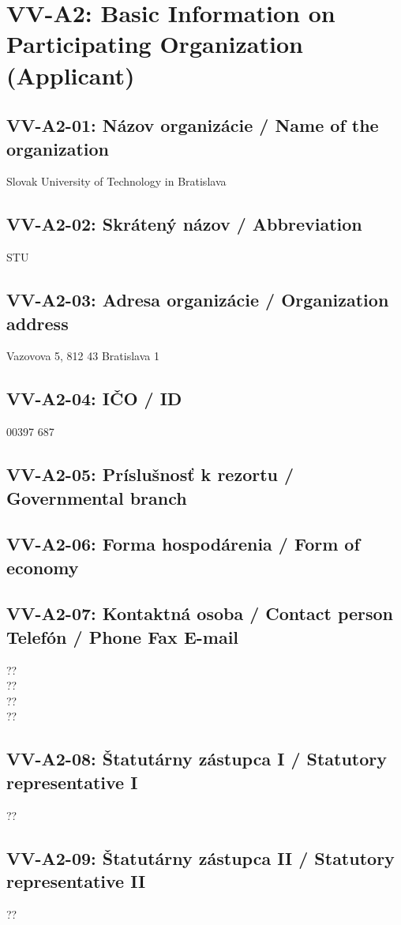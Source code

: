 \section*{VV-A2: Basic Information on Participating Organization (Applicant)}
\subsection*{VV-A2-01: Názov organizácie / Name of the organization}
Slovak University of Technology in Bratislava
\subsection*{VV-A2-02: Skrátený názov / Abbreviation}
STU
\subsection*{VV-A2-03: Adresa organizácie / Organization address}
Vazovova 5, 812 43 Bratislava 1
\subsection*{VV-A2-04: IČO / ID}
00397 687
\subsection*{VV-A2-05: Príslušnosť k rezortu / Governmental branch}
\subsection*{VV-A2-06: Forma hospodárenia / Form of economy}
\subsection*{VV-A2-07: Kontaktná osoba / Contact person \\
    Telefón / Phone 
    Fax 
    E-mail}
??\\
??\\
??\\
??
\subsection*{VV-A2-08: Štatutárny zástupca I / Statutory representative I}
??\\
\subsection*{VV-A2-09: Štatutárny zástupca II / Statutory representative II}
??\\
